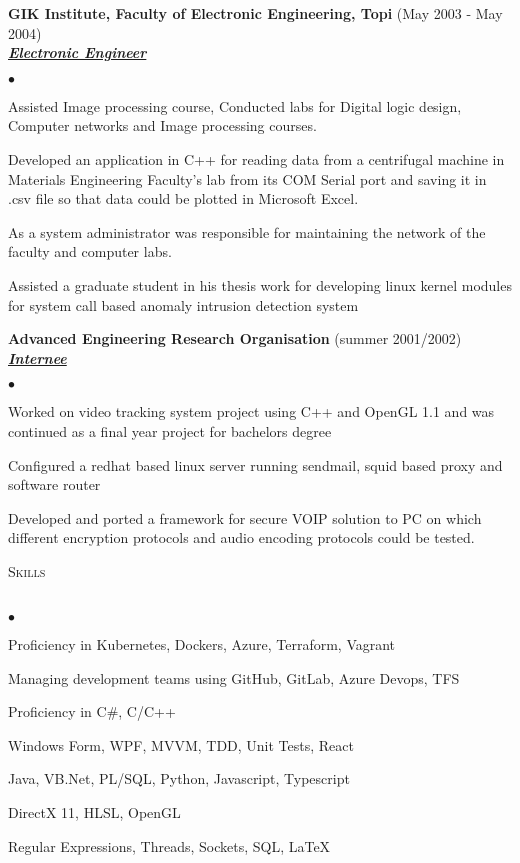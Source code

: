 \documentclass{article}
\newcommand{\lineunder}{\vspace*{-8pt} \\ \hspace*{-18pt} \hrulefill \\}
\newcommand{\header}[1]{{\hspace*{-15pt}\vspace*{6pt} \textsc{#1}} \vspace*{-6pt} \lineunder}
\newcommand{\employer}[3]{{ \textbf{#1} (#2)\\ \underline{\textbf{\emph{#3}}}\\  }}
\newenvironment{achievements}{\begin{list}{$\bullet$}{\topsep 0pt \itemsep -2pt}}{\vspace*{4pt}\end{list}}
\begin{document}
\employer{GIK Institute, Faculty of Electronic Engineering, Topi}{May 2003 - May 2004}{Electronic Engineer}
	\begin{achievements}
	\item Assisted Image processing course, Conducted labs for Digital logic design, Computer networks and Image processing courses.
	\item Developed an application in C++ for reading data from a centrifugal machine in Materials Engineering Faculty’s lab from its COM Serial port and saving it in .csv file so that data could be plotted in Microsoft Excel.
	\item As a system administrator was responsible for maintaining the network of the faculty and computer labs.
	\item Assisted a graduate student in his thesis work for developing linux kernel modules for system call based anomaly intrusion detection system
	\end{achievements}

\employer{Advanced Engineering Research Organisation}{summer 2001/2002}{Internee}
	\begin{achievements}
	\item Worked on video tracking system project using C++ and OpenGL 1.1 and was continued as a final year project for bachelors degree
	\item Configured a redhat based linux server running sendmail, squid based proxy and software router
	\item Developed and ported a framework for secure VOIP solution to PC on which different encryption protocols and audio encoding protocols could be tested.
	\end{achievements}

\header{Skills}
\begin{achievements}
\item Proficiency in Kubernetes, Dockers, Azure, Terraform, Vagrant
\item Managing development teams using GitHub, GitLab, Azure Devops, TFS
\item Proficiency in C\#, C/C++
\item Windows Form, WPF, MVVM, TDD, Unit Tests, React
\item Java, VB.Net, PL/SQL, Python, Javascript, Typescript
\item DirectX 11, HLSL, OpenGL
\item Regular Expressions, Threads, Sockets, SQL, \LaTeX
\end{achievements}
\end{document}
